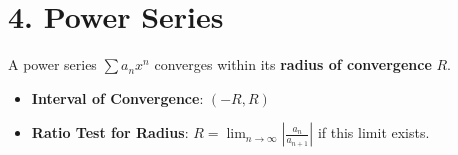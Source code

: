 \documentclass{article}
\begin{document}
\section*{4. Power Series}
A power series $\sum a_n x^n$ converges within its \textbf{radius of convergence} $R$.
\begin{itemize}
    \item \textbf{Interval of Convergence}: $( -R, R)$
    \item \textbf{Ratio Test for Radius}: $R = \lim_{n \to \infty} \left| \frac{a_n}{a_{n+1}} \right|$ if this limit exists.
\end{itemize}
\end{document}
